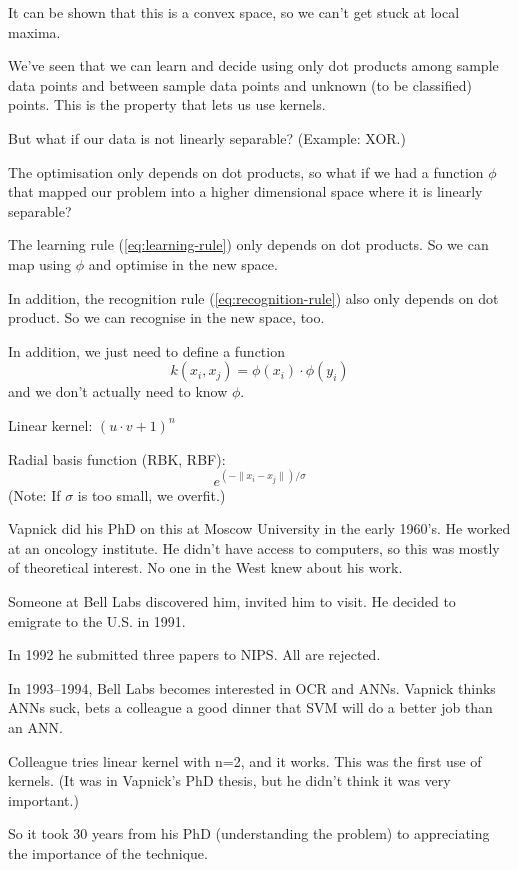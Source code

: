 It can be shown that this is a convex space, so we can't get stuck at
local maxima.

We've seen that we can learn and decide using only dot products among
sample data points and between sample data points and unknown (to be
classified) points.  This is the property that lets us use kernels.



But what if our data is not linearly separable?  (Example: XOR.)

The optimisation only depends on dot products, so what if we had a
function $\phi$ that mapped our problem into a higher dimensional
space where it is linearly separable?

The learning rule (\ref{eq:learning-rule}) only depends on dot
products.  So we can map using $\phi$ and optimise in the new space.

In addition, the recognition rule (\ref{eq:recognition-rule}) also
only depends on dot product.  So we can recognise in the new space,
too.

In addition, we just need to define a function
\begin{displaymath}
  k(x_i, x_j) = \phi(x_i)\cdot\phi(y_i)
\end{displaymath}
and we don't actually need to know $\phi$.




Linear kernel:
$(u\cdot v + 1)^n$

Radial basis function (RBK, RBF):
\begin{displaymath}
  e^{(-\parallel x_i - x_j\parallel) / \sigma}
\end{displaymath}
(Note: If $\sigma$ is too small, we overfit.)



Vapnick did his PhD on this at Moscow University in the early 1960's.
He worked at an oncology institute.  He didn't have access to
computers, so this was mostly of theoretical interest.  No one in the
West knew about his work.

Someone at Bell Labs discovered him, invited him to visit.  He decided
to emigrate to the U.S. in 1991.

In 1992 he submitted three papers to NIPS.  All are rejected.

In 1993--1994, Bell Labs becomes interested in OCR and ANNs.  Vapnick
thinks ANNs suck, bets a colleague a good dinner that SVM will do a
better job than an ANN.

Colleague tries linear kernel with n=2, and it works.  This was the
first use of kernels.  (It was in Vapnick's PhD thesis, but he didn't
think it was very important.)

So it took 30 years from his PhD (understanding the problem) to
appreciating the importance of the technique.





